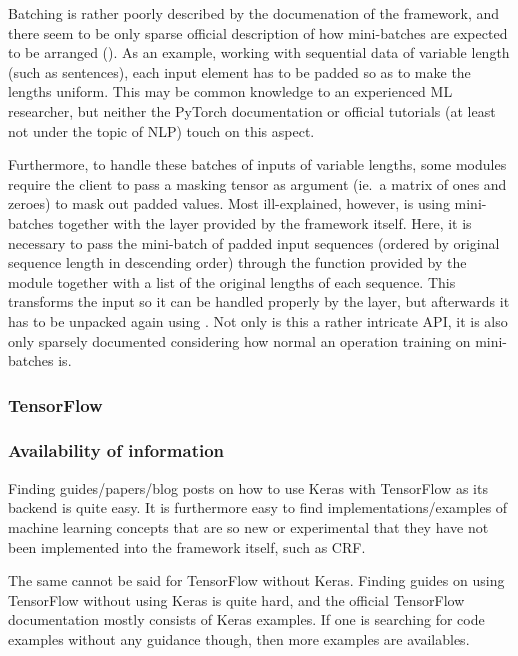 Batching is rather poorly described by the documenation of the framework, and
there seem to be only sparse official description of how mini-batches are
expected to be arranged (\cite{falcon2018lstms}).  As an example, working with
sequential data of variable length (such as sentences), each input element has
to be padded so as to make the lengths uniform. This may be common knowledge to an
experienced ML researcher, but neither the PyTorch documentation or official
tutorials (at least not under the topic of NLP) touch on this aspect.

Furthermore, to handle these batches of inputs of variable lengths, some modules
require the client to pass a masking tensor as argument (ie.\ a matrix of ones
and zeroes) to mask out padded values. Most ill-explained, however, is using
mini-batches together with the  layer provided by the framework
itself. Here, it is necessary to pass the mini-batch of padded input sequences
(ordered by original sequence length in descending order) through the
 function provided by the 
module together with a list of the original lengths of each sequence. This
transforms the input so it can be handled properly by the  layer, but
afterwards it has to be unpacked again using . Not
only is this a rather intricate API, it is also only sparsely documented
considering how normal an operation training on mini-batches is.


\subsubsection{TensorFlow}\label{sec:discuss_tensorflow}

\subsubsection*{Availability of information}

Finding guides/papers/blog posts on how to use Keras with TensorFlow as its
backend is quite easy. It is furthermore easy to find implementations/examples
of machine learning concepts that are so new or experimental that they have not
been implemented into the framework itself, such as CRF\@.

The same cannot be said for TensorFlow without Keras. Finding guides on using
TensorFlow without using Keras is quite hard, and the official TensorFlow
documentation mostly consists of Keras examples. If one is searching for code
examples without any guidance though, then more examples are availables.

